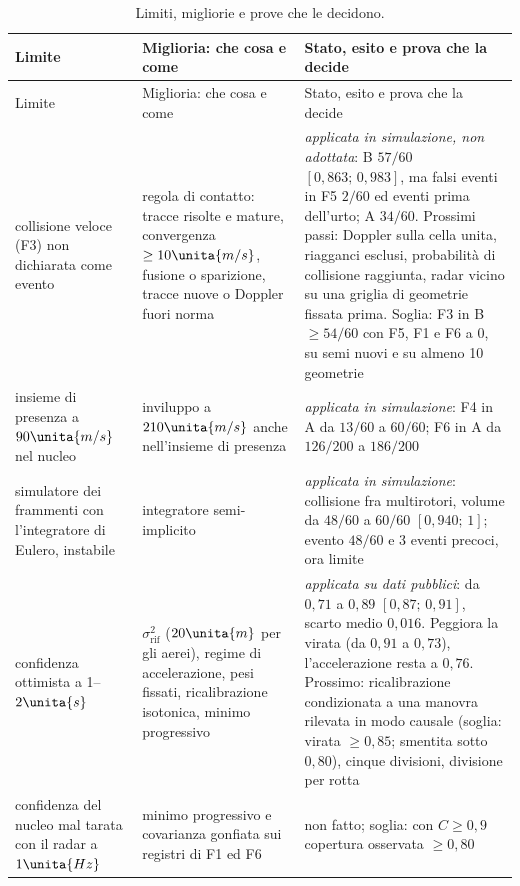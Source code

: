 {\footnotesize\setlength{\tabcolsep}{4pt}
\begin{longtable}{@{}>{\RaggedRight\arraybackslash}p{3.3cm}>{\RaggedRight\arraybackslash}p{5.6cm}>{\RaggedRight\arraybackslash}p{5.8cm}@{}}
\caption{Limiti, migliorie e prove che le decidono.}\label{tab:ps-migliorie}\\
\toprule
Limite & Miglioria: che cosa e come & Stato, esito e prova che la decide\\
\midrule
\endfirsthead
\toprule
Limite & Miglioria: che cosa e come & Stato, esito e prova che la decide\\
\midrule
\endhead
\bottomrule
\endfoot
collisione veloce (F3) non dichiarata come evento & regola di contatto: tracce risolte e mature, convergenza $\ge10\unita{m/s}$, fusione o sparizione, tracce nuove o Doppler fuori norma & \emph{applicata in simulazione, non adottata}: B $57/60$ $[0{,}863;\,0{,}983]$, ma falsi eventi in F5 $2/60$ ed eventi prima dell'urto; A $34/60$. Prossimi passi: Doppler sulla cella unita, riagganci esclusi, probabilità di collisione raggiunta, radar vicino su una griglia di geometrie fissata prima. Soglia: F3 in B $\ge54/60$ con F5, F1 e F6 a 0, su semi nuovi e su almeno 10 geometrie\\
insieme di presenza a $90\unita{m/s}$ nel nucleo & inviluppo a $210\unita{m/s}$ anche nell'insieme di presenza & \emph{applicata in simulazione}: F4 in A da $13/60$ a $60/60$; F6 in A da $126/200$ a $186/200$\\
simulatore dei frammenti con l'integratore di Eulero, instabile & integratore semi-implicito & \emph{applicata in simulazione}: collisione fra multirotori, volume da $48/60$ a $60/60$ $[0{,}940;\,1]$; evento $48/60$ e 3 eventi precoci, ora limite\\
confidenza ottimista a 1--$2\unita{s}$ & $\sigma_{\mathrm{rif}}^2$ ($20\unita{m}$ per gli aerei), regime di accelerazione, pesi fissati, ricalibrazione isotonica, minimo progressivo & \emph{applicata su dati pubblici}: da $0{,}71$ a $0{,}89$ $[0{,}87;\,0{,}91]$, scarto medio $0{,}016$. Peggiora la virata (da $0{,}91$ a $0{,}73$), l'accelerazione resta a $0{,}76$. Prossimo: ricalibrazione condizionata a una manovra rilevata in modo causale (soglia: virata $\ge0{,}85$; smentita sotto $0{,}80$), cinque divisioni, divisione per rotta\\
confidenza del nucleo mal tarata con il radar a $1\unita{Hz}$ & minimo progressivo e covarianza gonfiata sui registri di F1 ed F6 & non fatto; soglia: con $C\ge0{,}9$ copertura osservata $\ge0{,}80$\\

\end{longtable}}

